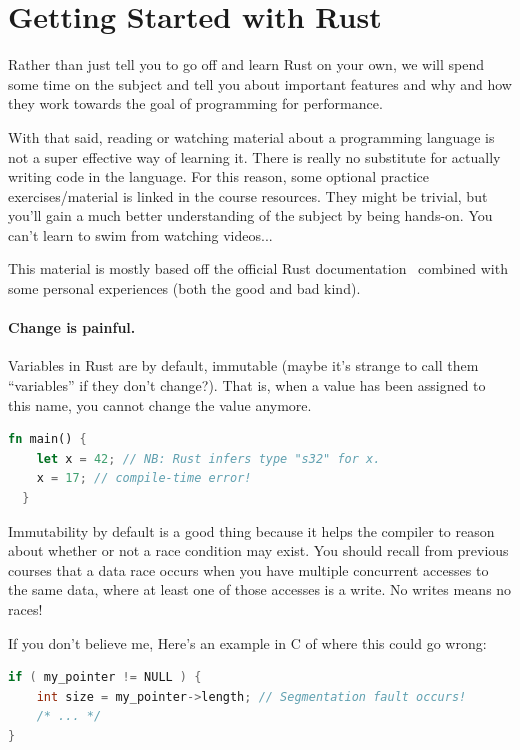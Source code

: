




\section*{Getting Started with Rust}
Rather than just tell you to go off and learn Rust on your own, we will spend some time on the subject and tell you about important features and why and how they work towards the goal of programming for performance.

With that said, reading or watching material about a programming language is not a super effective way of learning it. There is really no substitute for actually writing code in the language. For this reason, some optional practice exercises/material is linked in the course resources. They might be trivial, but you'll gain a much better understanding of the subject by being hands-on. You can't learn to swim from watching videos...

This material is mostly based off the official Rust documentation~\cite{rustdocs} combined with some personal experiences (both the good and bad kind). 

\paragraph{Change is painful.}
Variables in Rust are by default, immutable (maybe it's strange to call them ``variables'' if they don't change?). That is, when a value has been assigned to this name, you cannot change the value anymore.
\begin{lstlisting}[language=Rust]
  fn main() {
    let x = 42; // NB: Rust infers type "s32" for x.
    x = 17; // compile-time error!
  }
\end{lstlisting}

Immutability by default is a good thing because it helps the compiler to reason about whether or not a race condition may exist. You should recall from previous courses that a data race occurs when you have multiple concurrent accesses to the same data, where at least one of those accesses is a write. No writes means no races! 

If you don't believe me, Here's an example in C of where this could go wrong:
\begin{lstlisting}[language=C]
if ( my_pointer != NULL ) {
    int size = my_pointer->length; // Segmentation fault occurs!
    /* ... */
}
\end{lstlisting}

